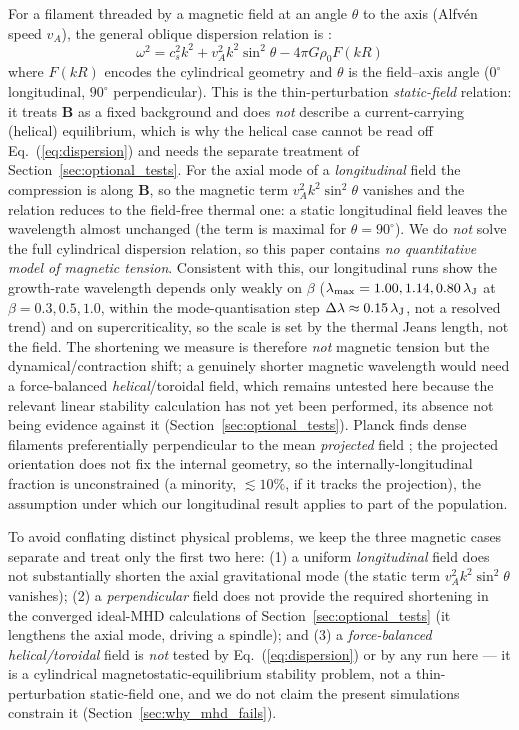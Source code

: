 \documentclass[usenatbib,twoside,twocolumn]{mnras}
\begin{document}
For a filament threaded by a magnetic field at an angle $\theta$ to the axis (Alfv\'en speed $v_A$), the general oblique dispersion relation is \citep{Nakamura1993}:
\begin{equation}
\omega^2 = c_s^2 k^2 + v_A^2 k^2 \sin^2\theta - 4\pi G\rho_0 F(kR)
\label{eq:dispersion}
\end{equation}
where $F(kR)$ encodes the cylindrical geometry and $\theta$ is the field--axis angle ($0^\circ$ longitudinal, $90^\circ$ perpendicular). This is the thin-perturbation \emph{static-field} relation: it treats $\mathbf{B}$ as a fixed background and does \emph{not} describe a current-carrying (helical) equilibrium, which is why the helical case cannot be read off Eq.~(\ref{eq:dispersion}) and needs the separate treatment of Section~\ref{sec:optional_tests}. For the axial mode of a \emph{longitudinal} field the compression is along $\mathbf{B}$, so the magnetic term $v_A^2k^2\sin^2\theta$ vanishes and the relation reduces to the field-free thermal one: a static longitudinal field leaves the wavelength almost unchanged (the term is maximal for $\theta=90^\circ$). We do \emph{not} solve the full cylindrical dispersion relation, so this paper contains \emph{no quantitative model of magnetic tension}. Consistent with this, our longitudinal runs show the growth-rate wavelength depends only weakly on $\beta$ ($\lambda_{\rm max}=1.00,1.14,0.80\,\lambda_{\rm J}$ at $\beta=0.3,0.5,1.0$, within the mode-quantisation step $\Delta\lambda\approx0.15\,\lambda_{\rm J}$, not a resolved trend) and on supercriticality, so the scale is set by the thermal Jeans length, not the field. The shortening we measure is therefore \emph{not} magnetic tension but the dynamical/contraction shift; a genuinely shorter magnetic wavelength would need a force-balanced \emph{helical}/toroidal field, which remains untested here because the relevant linear stability calculation has not yet been performed, its absence not being evidence against it (Section~\ref{sec:optional_tests}). Planck finds dense filaments preferentially perpendicular to the mean \emph{projected} field \citep{Jadhav2026}; the projected orientation does not fix the internal geometry, so the internally-longitudinal fraction is unconstrained (a minority, $\lesssim10\%$, if it tracks the projection), the assumption under which our longitudinal result applies to part of the population.

To avoid conflating distinct physical problems, we keep the three magnetic cases separate and treat only the first two here: (1) a uniform \emph{longitudinal} field does not substantially shorten the axial gravitational mode (the static term $v_A^2k^2\sin^2\theta$ vanishes); (2) a \emph{perpendicular} field does not provide the required shortening in the converged ideal-MHD calculations of Section~\ref{sec:optional_tests} (it lengthens the axial mode, driving a spindle); and (3) a \emph{force-balanced helical/toroidal} field is \emph{not} tested by Eq.~(\ref{eq:dispersion}) or by any run here --- it is a cylindrical magnetostatic-equilibrium stability problem, not a thin-perturbation static-field one, and we do not claim the present simulations constrain it (Section~\ref{sec:why_mhd_fails}).
\end{document}

